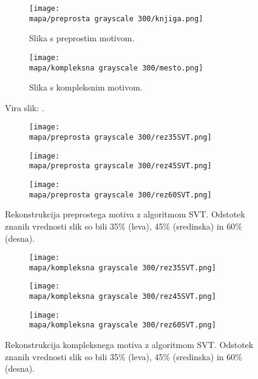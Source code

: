 \renewcommand{\mapa}{Poglavja/Slike/kompleksnost}

\begin{figure}[!ht]
    \begin{subfigure}{0.5\linewidth}
        \texttt{[image: \\mapa/preprosta grayscale 300/knjiga.png]}
        \caption{Slika s preprostim motivom.}
    \end{subfigure}
    \hfill
    \begin{subfigure}{0.5\linewidth}
        \texttt{[image: \\mapa/kompleksna grayscale 300/mesto.png]}
        \caption{Slika s kompleksnim motivom.}
    \end{subfigure}
    \caption{Vira slik: \cite{UnsplashKnjiga,UnsplashMesto}.}
\end{figure}

\begin{figure}[!ht]
    \begin{subfigure}{0.325\linewidth}
        \texttt{[image: \\mapa/preprosta grayscale 300/rez35SVT.png]}
    \end{subfigure}
    \hfill
    \begin{subfigure}{0.325\linewidth}
        \texttt{[image: \\mapa/preprosta grayscale 300/rez45SVT.png]}
    \end{subfigure}
    \hfill
    \begin{subfigure}{0.325\linewidth}
        \texttt{[image: \\mapa/preprosta grayscale 300/rez60SVT.png]}
    \end{subfigure}
    \caption{Rekonstrukcija preprostega motiva z algoritmom SVT. Odstotek znanih vrednosti slik so bili 35\% (leva), 45\% (sredinska) in 60\% (desna).
    }
\end{figure}
    
\begin{figure}[!ht]
    \begin{subfigure}{0.325\linewidth}
        \texttt{[image: \\mapa/kompleksna grayscale 300/rez35SVT.png]}
    \end{subfigure}
    \hfill
    \begin{subfigure}{0.325\linewidth}
        \texttt{[image: \\mapa/kompleksna grayscale 300/rez45SVT.png]}
    \end{subfigure}
    \hfill
    \begin{subfigure}{0.325\linewidth}
        \texttt{[image: \\mapa/kompleksna grayscale 300/rez60SVT.png]}
    \end{subfigure}
    \caption{Rekonstrukcija kompleksnega motiva z algoritmom SVT. Odstotek znanih vrednosti slik so bili 35\% (leva), 45\% (sredinska) in 60\% (desna).}
\end{figure}

